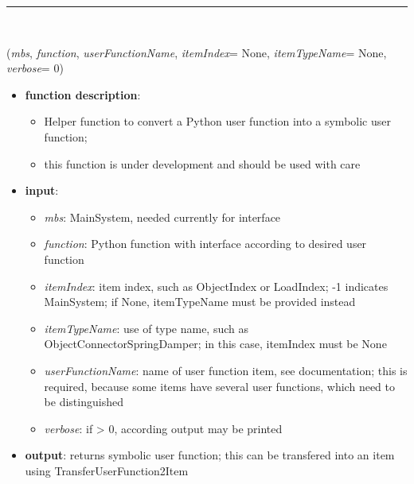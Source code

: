 \begin{itemize}[leftmargin=1.4cm]
\begin{itemize}[leftmargin=0.7cm]
\vspace{12pt}\end{itemize}
%
\noindent\rule{8cm}{0.75pt}\vspace{1pt} \\ 
\begin{flushleft}
\label{sec:advancedUtilities:CreateSymbolicUserFunction}
({\it mbs}, {\it function}, {\it userFunctionName}, {\it itemIndex}= None, {\it itemTypeName}= None, {\it verbose}= 0)
\end{flushleft}
\setlength{\itemindent}{0.7cm}
\begin{itemize}[leftmargin=0.7cm]
\item[--]
{\bf function description}: \vspace{-6pt}
\begin{itemize}[leftmargin=1.2cm]
\setlength{\itemindent}{-0.7cm}
\item[]Helper function to convert a Python user function into a symbolic user function;
\item[]this function is under development and should be used with care
\end{itemize}
\item[--]
{\bf input}: \vspace{-6pt}
\begin{itemize}[leftmargin=1.2cm]
\setlength{\itemindent}{-0.7cm}
\item[]{\it mbs}: MainSystem, needed currently for interface
\item[]{\it function}: Python function with interface according to desired user function
\item[]{\it itemIndex}: item index, such as ObjectIndex or LoadIndex; -1 indicates MainSystem; if None, itemTypeName must be provided instead
\item[]{\it itemTypeName}: use of type name, such as ObjectConnectorSpringDamper; in this case, itemIndex must be None
\item[]{\it userFunctionName}: name of user function item, see documentation; this is required, because some items have several user functions, which need to be distinguished
\item[]{\it verbose}: if > 0, according output may be printed
\end{itemize}
\item[--]
{\bf output}: returns symbolic user function; this can be transfered into an item using TransferUserFunction2Item

\end{itemize}
\end{itemize}
